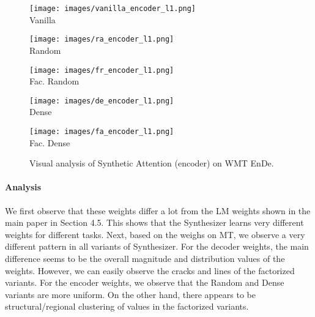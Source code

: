 \documentclass{article} \usepackage{iclr2021_conference,times}
\begin{document}
\begin{figure}[H]
\begin{minipage}{0.18\linewidth}
  \centering
     \texttt{[image: images/vanilla\_encoder\_l1.png]}
    \\ {Vanilla}
    \label{fig:sortiter}
\end{minipage}\hfill
\begin{minipage}{0.18\linewidth}
  \centering
     \texttt{[image: images/ra\_encoder\_l1.png]}
    \\ {Random}
    \label{fig:sortiter}
\end{minipage}\hfill
\begin{minipage}{0.18\linewidth}
  \centering
    \texttt{[image: images/fr\_encoder\_l1.png]}
    \\ {Fac. Random}
    \label{fig:temperature}
\end{minipage}\hfill
\begin{minipage}{0.18\linewidth}
  \centering
     \texttt{[image: images/de\_encoder\_l1.png]}
    \\ {Dense}
    \label{fig:sortiter}
\end{minipage}
\begin{minipage}{0.18\linewidth}
  \centering
     \texttt{[image: images/fa\_encoder\_l1.png]}
    \\ {Fac. Dense}
    \label{fig:sortiter}
\end{minipage}\hfill 
\label{fig:analysis}
\caption{Visual analysis of Synthetic Attention (encoder) on WMT EnDe.}
\end{figure}

\paragraph{Analysis} We first observe that these weights differ a lot from the LM weights shown in the main paper in Section 4.5. This shows that the Synthesizer learns very different weights for different tasks. Next, based on the weighs on MT, we observe a very different pattern in all variants of Synthesizer. For the decoder weights, the main difference seems to be the overall magnitude and distribution values of the weights. However, we can easily observe the cracks and lines of the factorized variants. For the encoder weights, we observe that the Random and Dense variants are more uniform. On the other hand, there appears to be structural/regional clustering of values in the factorized variants.
\end{document}

